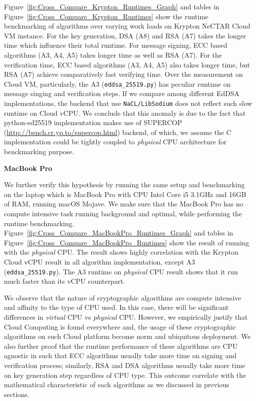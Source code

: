 \documentclass[10pt,sigconf]{acmart}
\begin{document}
Figure~\ref{fig:Cross_Compare_Krypton_Runtimes_Graph} and tables in Figure~\ref{fig:Cross_Compare_Krypton_Runtimes} show the runtime benckmarking of algorithms over varying work loads on Krypton NeCTAR Cloud VM instance. For the key generation, DSA (A8) and RSA (A7) takes the longer time which influence their total runtime. For message signing, ECC based algorithms (A3, A4, A5) takes longer time as well as RSA (A7). For the verification time, ECC based algorithms (A3, A4, A5) also takes longer time, but RSA (A7) achieve comparatively fast verifying time. Over the measurement on Cloud VM, particularly, the A3 (\verb|eddsa_25519.py|) has peculiar runtime on message singing and verification steps. If we compare among different EdDSA implementations, the backend that use \verb|NaCL/LibSodium| does not reflect such slow runtime on Cloud vCPU. We conclude that this anomaly is due to the fact that python-ed25519 \cite{BrianWarner} implementation makes use of SUPERCOP (\url {http://bench.cr.yp.to/supercop.html}) backend, of which, we assume the C implementation could be tightly coupled to \textit{physical} CPU architecture for benckmarking purpose.

\vspace{0.4em}

\noindent \textbf{MacBook Pro}

We further verify this hypothesis by running the same setup and benchmarking on the laptop which is MacBook Pro with CPU Intel Core i5 3.1GHz and 16GB of RAM, running macOS Mojave. We make sure that the MacBook Pro has no compute intensive task running background and optimal, while performing the runtime benchmarking. Figure~\ref{fig:Cross_Compare_MacBookPro_Runtimes_Graph} and tables in Figure~\ref{fig:Cross_Compare_MacBookPro_Runtimes} show the result of running with the \textit{physical} CPU. The result shows highly correlation with the Krypton Cloud vCPU result in all algorithm implementation, except A3 (\verb|eddsa_25519.py|). The A3 runtime on \textit{physical} CPU result shows that it run much faster than its vCPU counterpart.

We observe that the nature of cryptographic algorithms are compute intensive and affinity to the type of CPU used. In this case, there will be significant differences in \textit{virtual} CPU vs \textit{physical} CPU. However, we empirically justify that Cloud Computing is found everywhere \cite{Armbrust:2010:VCC:1721654.1721672} and, the usage of these cryptographic algorithms on such Cloud platform become norm and ubiquitous deployment. We also further proof that the runtime performance of these algorithms are CPU agnostic in such that ECC algorithms usually take more time on signing and verification process; similarly, RSA and DSA algorithms usually take more time on key generation step regardless of CPU type. This outcome correlate with the mathematical characteristic of each algorithms as we discussed in previous sections.
\end{document}

